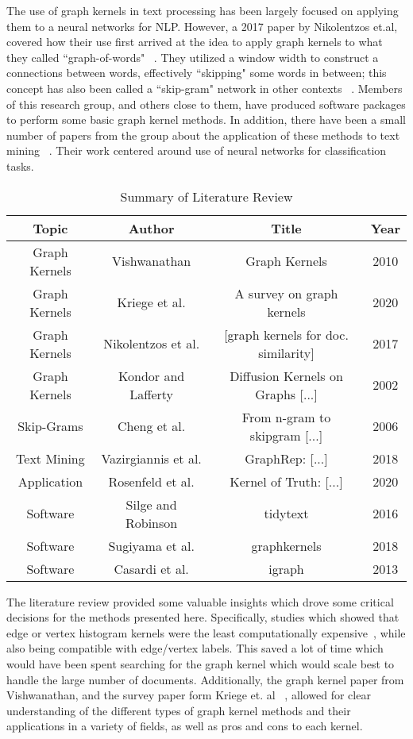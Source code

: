 The use of graph kernels in text processing has been largely focused on applying them to a neural networks for NLP. However, a 2017 paper by Nikolentzos et.al, covered how their use first arrived at the idea to apply graph kernels to what they called ``graph-of-words" ~\cite{nikolentzos2017shortest}. They utilized a window width to construct a connections between words, effectively ``skipping" some words in between; this concept has also been called a ``skip-gram" network in other contexts ~\cite{cheng2006n}. Members of this research group, and others close to them, have produced software packages to perform some basic graph kernel methods. In addition, there have been a small number of papers from the group about the application of these methods to text mining ~\cite{sugiyama2018graphkernels}. Their work centered around use of neural networks for classification tasks. 
\begin{table}[H]
\caption{Summary of Literature Review}
\centering
\begin{tabular}{ c c c c}
\hline
\hline
Topic & Author & Title & Year \\ [0.5ex]
\hline
Graph Kernels & Vishwanathan & Graph Kernels & 2010\\
Graph Kernels & Kriege et al. & A survey on graph kernels & 2020\\
Graph Kernels & Nikolentzos et al. & [graph kernels for doc. similarity] & 2017\\
Graph Kernels & Kondor and Lafferty &  Diffusion Kernels on Graphs [...] & 2002\\
Skip-Grams & Cheng et al. & From n-gram to skipgram [...] & 2006\\
Text Mining & Vazirgiannis et al. & GraphRep: [...] & 2018 \\
Application & Rosenfeld et al. & Kernel of Truth: [...] & 2020\\
Software & Silge and Robinson& tidytext &  2016\\
Software & Sugiyama et al. & graphkernels & 2018 \\
Software & Casardi et al. & igraph & 2013\\
\hline
\end{tabular}
\end{table}

The literature review provided some valuable insights which drove some critical decisions for the methods presented here. Specifically, studies which showed that edge or vertex histogram kernels were the least computationally expensive~\cite{sugiyama2018graphkernels}, while also being compatible with edge/vertex labels. This saved a lot of time which would have been spent searching for the graph kernel which would scale best to handle the large number of documents. Additionally, the graph kernel paper from Vishwanathan, and the survey paper form Kriege et. al ~\cite{kriege2020survey}, allowed for clear understanding of the different types of graph kernel methods and their applications in a variety of fields, as well as pros and cons to each kernel.\\


